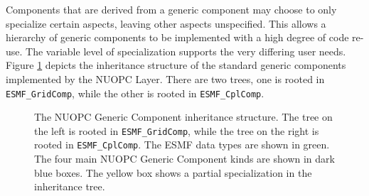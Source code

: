 Components that are derived from a generic component may choose to only specialize certain aspects, leaving other aspects unspecified. This allows a hierarchy of generic components to be implemented with a high degree of code re-use. The variable level of specialization supports the very differing user needs. Figure \ref{fig:NUOPCGenericComp} depicts the inheritance structure of the standard generic components implemented by the NUOPC Layer. There are two trees, one is rooted in {\tt ESMF\_GridComp}, while the other is rooted in {\tt ESMF\_CplComp}.

\begin{figure}[h]
\begin{center}
\vspace{.5in}
\end{center}
\caption{The NUOPC Generic Component inheritance structure. The tree on the left is rooted in {\tt ESMF\_GridComp}, while the tree on the right is rooted in {\tt ESMF\_CplComp}. The ESMF data types are shown in green. The four main NUOPC Generic Component kinds are shown in dark blue boxes. The yellow box shows a partial specialization in the inheritance tree.}
\label{fig:NUOPCGenericComp}
\end{figure}



